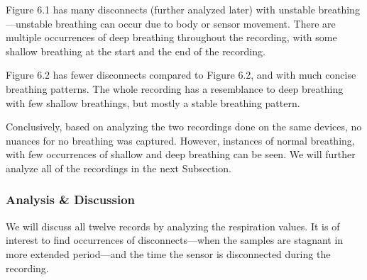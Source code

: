 Figure 6.1 has many disconnects (further analyzed later) with unstable breathing---unstable breathing can occur due to body or sensor movement. There are multiple occurrences of deep breathing throughout the recording, with some shallow breathing at the start and the end of the recording. 

Figure 6.2 has fewer disconnects compared to Figure 6.2, and with much concise breathing patterns. The whole recording has a resemblance to deep breathing with few shallow breathings, but mostly a stable breathing pattern.

Conclusively, based on analyzing the two recordings done on the same devices, no nuances for no breathing was captured. However, instances of normal breathing, with few occurrences of shallow and deep breathing can be seen. We will further analyze all of the recordings in the next Subsection. 

\subsubsection{Analysis \& Discussion}
We will discuss all twelve records by analyzing the respiration values. It is of interest to find occurrences of disconnects---when the samples are stagnant in more extended period---and the time the sensor is disconnected during the recording.

\begin{table}[!h]
\begin{center}
\caption{Day 1---Duration: 1 hour \& Roof Samples: 5145}
\end{center}
\end{table}


